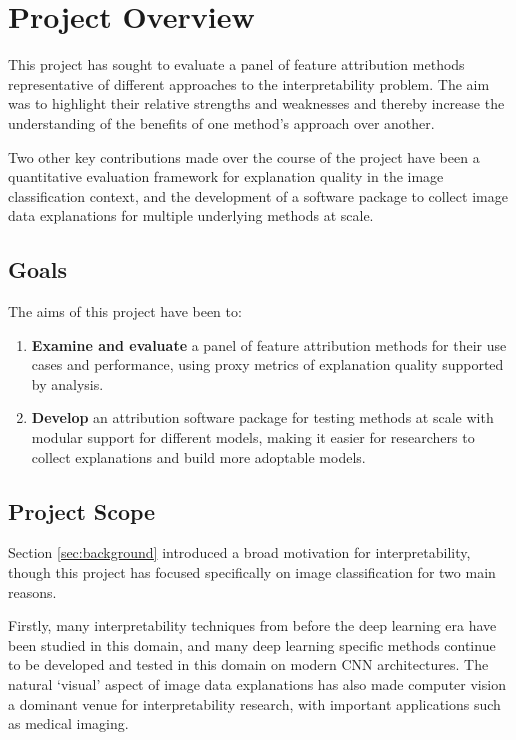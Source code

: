 \documentclass[main]{subfiles}
\begin{document}

\section{Project Overview}
This project has sought to evaluate a panel of feature attribution methods representative of different approaches to the interpretability problem. The aim was to highlight their relative strengths and weaknesses and thereby increase the understanding of the benefits of one method's approach over another.

Two other  key contributions made over the course of the project have been a quantitative evaluation framework for explanation quality in the image classification context, and the development of a software package to collect image data explanations for multiple underlying methods at scale.

\subsection*{Goals}
The aims of this project have been to:
\begin{enumerate}
	\item \textbf{Examine and evaluate} a panel of feature attribution methods for their use cases and performance, using proxy metrics of explanation quality supported by analysis.

	\item \textbf{Develop} an attribution software package for testing methods at scale with modular support for different models, making it easier for researchers to collect explanations and build more adoptable models.
	
\end{enumerate}


\newpage

\subsection*{Project Scope} \label{sec:intro_scope}

Section \ref{sec:background} introduced a broad motivation for interpretability, though this project has focused specifically on image classification for two main reasons.

Firstly, many interpretability techniques from before the deep learning era have been studied in this domain, and many deep learning specific methods continue to be developed and tested in this domain on modern CNN architectures. The natural `visual' aspect of  image data explanations has also made computer vision a dominant venue for interpretability research, with important applications such as medical imaging.
 
\end{document}
